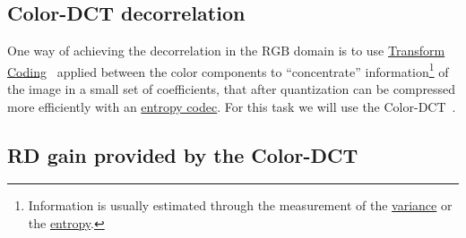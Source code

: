 \subsection{Color-DCT decorrelation}

One way of achieving the decorrelation in the $\text{RGB}$ domain is
to use
\href{https://vicente-gonzalez-ruiz.github.io/transform_coding/}{Transform
  Coding}~\cite{vruiz__transform_coding} applied between the color
components to ``concentrate'' information\footnote{Information is
usually estimated through the measurement of the
\href{https://en.wikipedia.org/wiki/Variance}{variance} or the
\href{https://en.wikipedia.org/wiki/Entropy}{entropy}.} of the image
in a small set of coefficients, that after quantization can be
compressed more efficiently with an
\href{https://en.wikipedia.org/wiki/Entropy_coding}{entropy
  codec}. For this task we will use the
Color-DCT~\cite{vruiz__color_DCT}.





\subsection{RD gain provided by the Color-DCT}

